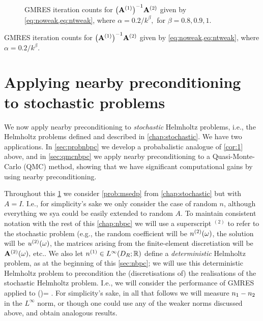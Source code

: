     \begin{figure}
    
      \caption{GMRES iteration counts for $\AmatoI\Amatt$ given by \cref{eq:noweak,eq:ntweak}, where $\alpha = 0.2/k^\beta,$ for $\beta = 0.8,0.9,1.$}\label{fig:l1high}
\end{figure}
      
\begin{table}
  \centering
  
  \caption{GMRES iteration counts for $\AmatoI\Amatt$ given by \cref{eq:noweak,eq:ntweak}, where $\alpha = 0.2/k^\beta.$}\label{tab:l1}
  \end{table}

\section{Applying nearby preconditioning to stochastic problems}\label{sec:nbpcstochastic}

We now apply nearby preconditioning to \emph{stochastic} Helmholtz problems, i.e., the Helmholtz problems defined and described in \cref{chap:stochastic}. We have two applications. In \cref{sec:probnbpc} we develop a probabalistic analogue of \cref{cor:1} above, and in \cref{sec:qmcnbpc} we apply nearby preconditioning to a Quasi-Monte-Carlo (QMC) method, showing that we have significant computational gains by using nearby preconditioning.

Throughout this \cref{sec:nbpcstochastic} we consider \cref{prob:msedp} from \cref{chap:stochastic} but with $A=I$. I.e., for simplicity's sake we only consider the case of random $n$, although everything we sya could be easily extended to random $A$. To maintain consistent notation with the rest of this \cref{chap:nbpc} we will use a superscript ${}^{(2)}$ to refer to the stochastic problem (e.g., the random coefficient will be ${n}^{(2)}(\omega)$, the solution will be ${u}^{(2)}(\omega)$, the matrices arising from the finite-element discretiation will be $\mathbf{A}^{(2)}(\omega),$ etc.. We also let $\nso \in \LiDRRR$ define a \emph{deterministic} Helmholtz problem, as at the beginning of this \cref{sec:nbpc}; we will use this deterministic Helmholtz problem to precondition the (discretisations of) the realisations of the stochastic Helmholtz problem. I.e., we will consider the performance of GMRES applied to
\beq\label{eq:stopc}
\AmatoI\Amatt(\omega)\bu = \AmatoI \bff.
\eeq
For simplicity's sake, in all that follows we will measure $n_{1}-n_{2}$ in the $L^{\infty}$ norm, or though one could use any of the weaker norms discussed above, and obtain analogous results.

